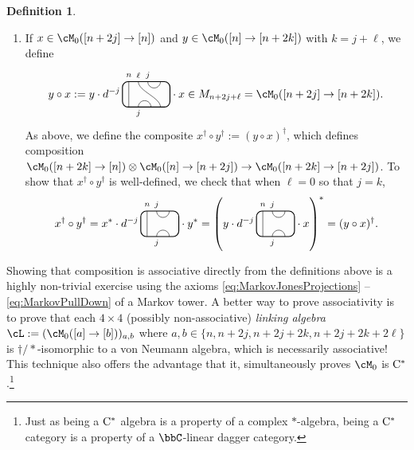 \documentclass[11pt]{article}
\theoremstyle{plain}
\theoremstyle{definition}
\newtheorem{defn}[thm]{Definition}
\newcommand{\Cstar}{\rm{C^*}}
\begin{document}
\begin{defn}
\begin{itemize}
\begin{enumerate}[label={\rm(C\arabic*)}]
\item
\label{compose:downup}
If $x\in \cM_0([n+2j] \to [n])$ and $y\in \cM_0([n] \to [n+2k])$ with $k=j+\ell$, we define
$$
y\circ x 
:=
y\cdot
d^{-j}\,
\begin{tikzpicture}[baseline = .3cm]
	\draw[thick, rounded corners = 5pt] (0,0) rectangle (1.5,.8);
	\draw (.2,0) -- (.2,.8);
	\draw (.8,.8) arc (-180:0:.2cm);
	\draw (1.2,0) .. controls ++(90:.3cm) and ++(270:.3cm) .. (.5,.8);
	\draw (.5,0) arc (180:0:.2cm);
	\node at (.2,1) {\scriptsize{$n$}};
	\node at (.5,1) {\scriptsize{$\ell$}};
	\node at (.8,1) {\scriptsize{$j$}};
	\node at (.5,-.2) {\scriptsize{$j$}};
\end{tikzpicture}
\cdot x
\in
M_{n+2j+\ell}
=
\cM_0([n+2j] \to [n+2k]).
$$
As above, we define the composite $x^\dag \circ y^\dag := (y\circ x)^\dag$, which defines composition
$\cM_0([n+2k] \to [n]) \otimes \cM_0([n] \to [n+2j]) \to \cM_0([n+2k] \to [n+2j])$.
To show that $x^\dag \circ y^\dag$ is well-defined, we check that when $\ell=0$ so that $j=k$, 
\begin{equation}
\label{eq:n+2j to n to n+2j}
x^\dag \circ y^\dag 
=
x^* \cdot
d^{-j}\,
\begin{tikzpicture}[baseline = .3cm]
	\draw[thick, rounded corners = 5pt] (0,0) rectangle (1.2,.8);
	\draw (.2,0) -- (.2,.8);
	\draw (.5,.8) arc (-180:0:.2cm);
	\draw (.5,0) arc (180:0:.2cm);
	\node at (.2,1) {\scriptsize{$n$}};
	\node at (.5,1) {\scriptsize{$j$}};
	\node at (.5,-.2) {\scriptsize{$j$}};
\end{tikzpicture}
\cdot y^*
=
\left(
y \cdot
d^{-j}\,
\begin{tikzpicture}[baseline = .3cm]
	\draw[thick, rounded corners = 5pt] (0,0) rectangle (1.2,.8);
	\draw (.2,0) -- (.2,.8);
	\draw (.5,.8) arc (-180:0:.2cm);
	\draw (.5,0) arc (180:0:.2cm);
	\node at (.2,1) {\scriptsize{$n$}};
	\node at (.5,1) {\scriptsize{$j$}};
	\node at (.5,-.2) {\scriptsize{$j$}};
\end{tikzpicture}
\cdot x
\right)^*
=
(y\circ x)^\dag.
\end{equation}
\end{enumerate}
\end{itemize}
Showing that composition is associative directly from the definitions above is a highly non-trivial exercise using the axioms \ref{eq:MarkovJonesProjections} -- \ref{eq:MarkovPullDown} of a Markov tower.
A better way to prove associativity is to prove that each $4\times 4$ (possibly non-associative) \emph{linking algebra} \cite{MR808930} 
$\cL:=(\cM_0([a] \to[b]))_{a,b}$ where $a,b\in \{n, n+2j, n+2j+2k, n+2j+2k+2\ell\}$
is $\dag/*$-isomorphic to a von Neumann algebra, which is necessarily associative!
This technique also offers the advantage that it, simultaneously proves $\cM_0$ is $\Cstar$.\footnote{
Just as being a $\Cstar$ algebra is a property of a complex $*$-algebra, being a $\Cstar$ category is a property of a $\bbC$-linear dagger category.
}


\end{defn}
\end{document}
